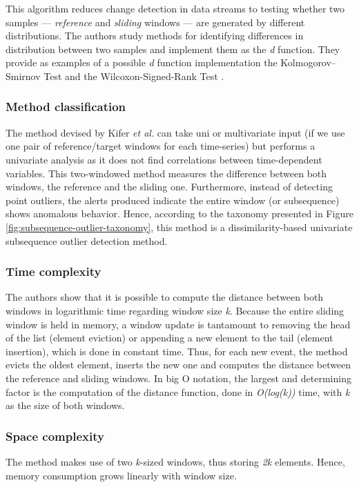 This algorithm reduces change detection in data streams to testing whether two samples --- \textit{reference} and \textit{sliding} windows --- are generated by different distributions. The authors study methods for identifying differences in distribution between two samples and implement them as the \textit{d} function. They provide as examples of a possible \textit{d} function implementation the  Kolmogorov–Smirnov Test \cite{Kolmogorov-Smirnov} and the Wilcoxon-Signed-Rank Test \cite{Wilcoxon}.

\subsubsection*{Method classification}
The method devised by Kifer \emph{et al.} can take uni or multivariate input (if we use one pair of reference/target windows for each time-series) but performs a univariate analysis as it does not find correlations between time-dependent variables. This two-windowed method measures the difference between both windows, the reference and the sliding one. Furthermore, instead of detecting point outliers, the alerts produced indicate the entire window (or subsequence) shows anomalous behavior. Hence, according to the taxonomy presented in Figure \ref{fig:subsequence-outlier-taxonomy}, this method is a dissimilarity-based univariate subsequence outlier detection method.

\subsubsection*{Time complexity}
The authors show that it is possible to compute the distance between both windows in logarithmic time regarding window size \textit{k}. Because the entire sliding window is held in memory, a window update is tantamount to removing the head of the list (element eviction) or appending a new element to the tail (element insertion), which is done in constant time. Thus, for each new event, the method evicts the oldest element, inserts the new one and computes the distance between the reference and sliding windows. In big O notation, the largest and determining factor is the computation of the distance function, done in \textit{O(log(k))} time, with \textit{k} as the size of both windows.

\subsubsection*{Space complexity}
The method makes use of two \textit{k}-sized windows, thus storing \textit{2k} elements. Hence, memory consumption grows linearly with window size.

